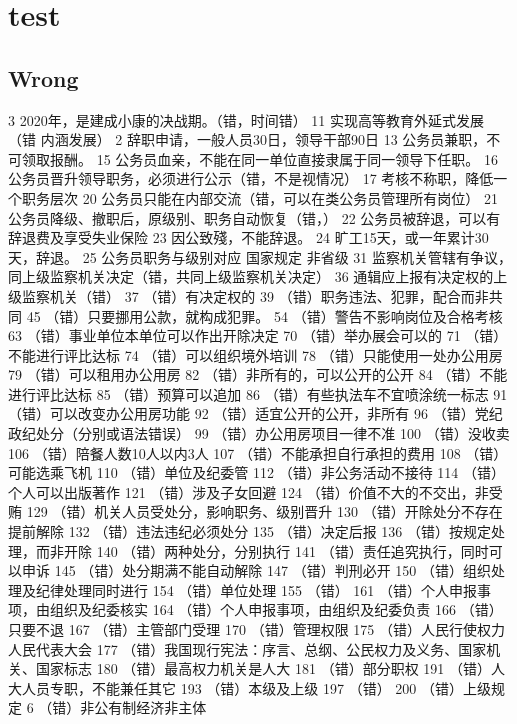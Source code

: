 \documentclass[11pt]{ctexart}
\author{mac}
\date{\today}
\title{}
\begin{document}
\tableofcontents

\section{test}
\label{sec:orgb4d9791}
\subsection{Wrong}
\label{sec:org6a8b78a}
3 2020年，是建成小康的决战期。（错，时间错）
11 实现高等教育外延式发展 （错 内涵发展）
2 辞职申请，一般人员30日，领导干部90日
13 公务员兼职，不可领取报酬。
15 公务员血亲，不能在同一单位直接隶属于同一领导下任职。
16 公务员晋升领导职务，必须进行公示（错，不是视情况）
17 考核不称职，降低一个职务层次
20 公务员只能在内部交流（错，可以在类公务员管理所有岗位）
21 公务员降级、撤职后，原级别、职务自动恢复（错，）
22 公务员被辞退，可以有辞退费及享受失业保险
23 因公致殘，不能辞退。
24 旷工15天，或一年累计30天，辞退。
25 公务员职务与级别对应 国家规定 非省级
31 监察机关管辖有争议，同上级监察机关决定（错，共同上级监察机关决定）
36 通辑应上报有决定权的上级监察机关（错）
37 （错）有决定权的
39 （错）职务违法、犯罪，配合而非共同
45 （错）只要挪用公款，就构成犯罪。
54 （错）警告不影响岗位及合格考核
63 （错）事业单位本单位可以作出开除决定
70 （错）举办展会可以的
71 （错）不能进行评比达标
74 （错）可以组织境外培训
78 （错）只能使用一处办公用房
79 （错）可以租用办公用房
82 （错）非所有的，可以公开的公开
84 （错）不能进行评比达标
85 （错）预算可以追加
86 （错）有些执法车不宜喷涂统一标志
91（错）可以改变办公用房功能
92 （错）适宜公开的公开，非所有
96 （错）党纪政纪处分（分别或语法错误）
99 （错）办公用房项目一律不准
100 （错）没收卖
106 （错）陪餐人数10人以内3人
107 （错）不能承担自行承担的费用
108 （错）可能选乘飞机
110 （错）单位及纪委管
112 （错）非公务活动不接待
114 （错）个人可以出版著作
121 （错）涉及子女回避
124 （错）价值不大的不交出，非受贿
129 （错）机关人员受处分，影响职务、级别晋升
130 （错）开除处分不存在提前解除
132 （错）违法违纪必须处分
135 （错）决定后报
136 （错）按规定处理，而非开除
140 （错）两种处分，分别执行
141 （错）责任追究执行，同时可以申诉
145 （错）处分期满不能自动解除
147 （错）判刑必开
150 （错）组织处理及纪律处理同时进行
154 （错）单位处理
155 （错）
161 （错）个人申报事项，由组织及纪委核实
164 （错）个人申报事项，由组织及纪委负责
166 （错）只要不退
167 （错）主管部门受理
170 （错）管理权限
175 （错）人民行使权力人民代表大会
177 （错）我国现行宪法：序言、总纲、公民权力及义务、国家机关、国家标志
180 （错）最高权力机关是人大
181 （错）部分职权
191 （错）人大人员专职，不能兼任其它
193 （错）本级及上级
197 （错）
200 （错）上级规定
6 （错）非公有制经济非主体
\end{document}
